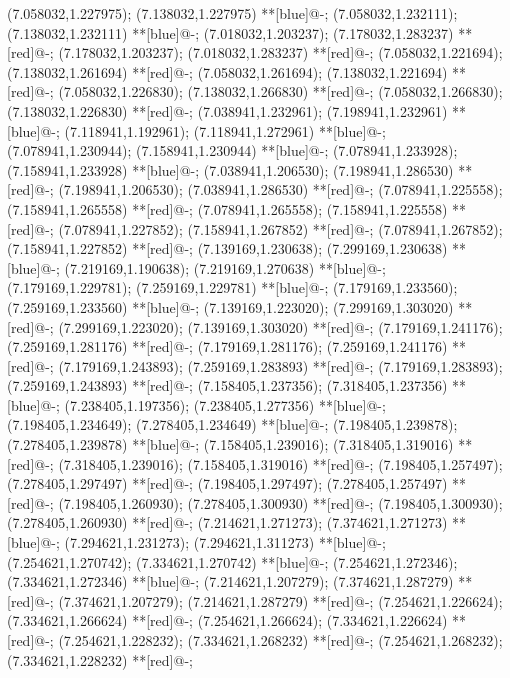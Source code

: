 (7.058032,1.227975); (7.138032,1.227975) **[blue]@{-};
(7.058032,1.232111); (7.138032,1.232111) **[blue]@{-};
(7.018032,1.203237); (7.178032,1.283237) **[red]@{-};
(7.178032,1.203237); (7.018032,1.283237) **[red]@{-};
(7.058032,1.221694); (7.138032,1.261694) **[red]@{-};
(7.058032,1.261694); (7.138032,1.221694) **[red]@{-};
(7.058032,1.226830); (7.138032,1.266830) **[red]@{-};
(7.058032,1.266830); (7.138032,1.226830) **[red]@{-};
(7.038941,1.232961); (7.198941,1.232961) **[blue]@{-};
(7.118941,1.192961); (7.118941,1.272961) **[blue]@{-};
(7.078941,1.230944); (7.158941,1.230944) **[blue]@{-};
(7.078941,1.233928); (7.158941,1.233928) **[blue]@{-};
(7.038941,1.206530); (7.198941,1.286530) **[red]@{-};
(7.198941,1.206530); (7.038941,1.286530) **[red]@{-};
(7.078941,1.225558); (7.158941,1.265558) **[red]@{-};
(7.078941,1.265558); (7.158941,1.225558) **[red]@{-};
(7.078941,1.227852); (7.158941,1.267852) **[red]@{-};
(7.078941,1.267852); (7.158941,1.227852) **[red]@{-};
(7.139169,1.230638); (7.299169,1.230638) **[blue]@{-};
(7.219169,1.190638); (7.219169,1.270638) **[blue]@{-};
(7.179169,1.229781); (7.259169,1.229781) **[blue]@{-};
(7.179169,1.233560); (7.259169,1.233560) **[blue]@{-};
(7.139169,1.223020); (7.299169,1.303020) **[red]@{-};
(7.299169,1.223020); (7.139169,1.303020) **[red]@{-};
(7.179169,1.241176); (7.259169,1.281176) **[red]@{-};
(7.179169,1.281176); (7.259169,1.241176) **[red]@{-};
(7.179169,1.243893); (7.259169,1.283893) **[red]@{-};
(7.179169,1.283893); (7.259169,1.243893) **[red]@{-};
(7.158405,1.237356); (7.318405,1.237356) **[blue]@{-};
(7.238405,1.197356); (7.238405,1.277356) **[blue]@{-};
(7.198405,1.234649); (7.278405,1.234649) **[blue]@{-};
(7.198405,1.239878); (7.278405,1.239878) **[blue]@{-};
(7.158405,1.239016); (7.318405,1.319016) **[red]@{-};
(7.318405,1.239016); (7.158405,1.319016) **[red]@{-};
(7.198405,1.257497); (7.278405,1.297497) **[red]@{-};
(7.198405,1.297497); (7.278405,1.257497) **[red]@{-};
(7.198405,1.260930); (7.278405,1.300930) **[red]@{-};
(7.198405,1.300930); (7.278405,1.260930) **[red]@{-};
(7.214621,1.271273); (7.374621,1.271273) **[blue]@{-};
(7.294621,1.231273); (7.294621,1.311273) **[blue]@{-};
(7.254621,1.270742); (7.334621,1.270742) **[blue]@{-};
(7.254621,1.272346); (7.334621,1.272346) **[blue]@{-};
(7.214621,1.207279); (7.374621,1.287279) **[red]@{-};
(7.374621,1.207279); (7.214621,1.287279) **[red]@{-};
(7.254621,1.226624); (7.334621,1.266624) **[red]@{-};
(7.254621,1.266624); (7.334621,1.226624) **[red]@{-};
(7.254621,1.228232); (7.334621,1.268232) **[red]@{-};
(7.254621,1.268232); (7.334621,1.228232) **[red]@{-};
